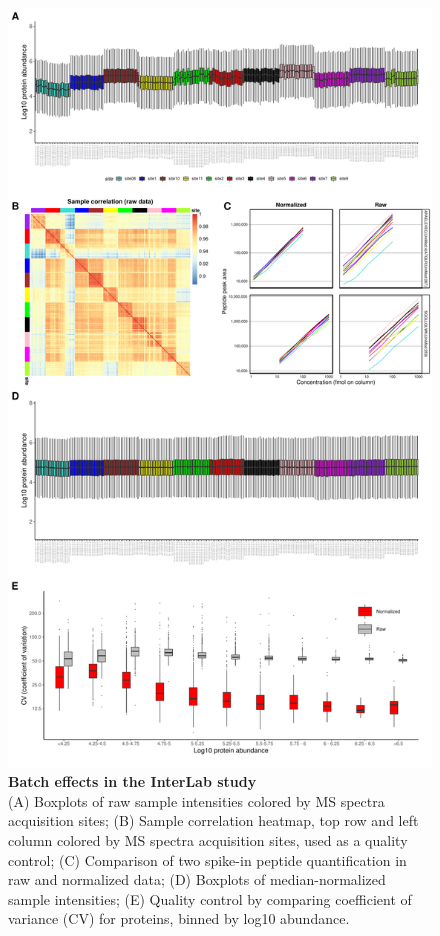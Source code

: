 \documentclass[num-refs]{wiley-article}
\begin{document}
\begin{figure}
	\centering
	\includegraphics[width=\textwidth,height=.9\textheight,keepaspectratio]{figures/Supp_InterLab.pdf}
	\caption{\textbf{Batch effects in the InterLab study}\\
		 \footnotesize  (A) Boxplots of raw sample intensities colored by MS spectra acquisition sites; (B) Sample correlation heatmap, top row and left column colored by MS spectra acquisition sites, used as a quality control; (C) Comparison of two spike-in peptide quantification in raw and normalized data; (D) Boxplots of median-normalized sample intensities; (E) Quality control by comparing coefficient of variance (CV) for proteins, binned by log10 abundance.}
	\label{fig:batch_figS1_InterLab}
\end{figure}
\end{document}
